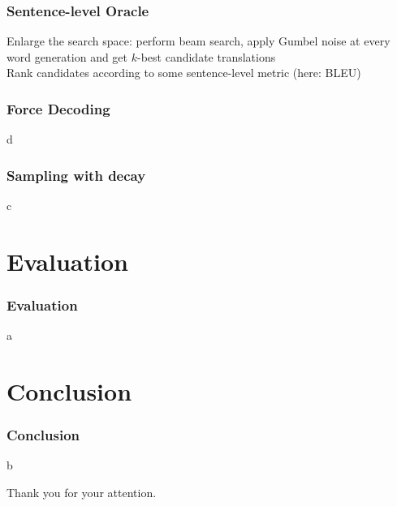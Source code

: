 \documentclass{beamer}
\begin{document}

\begin{frame}
   \frametitle{Sentence-level Oracle}
   Enlarge the search space: perform beam search, apply Gumbel noise at every word generation and get $k$-best candidate translations\\
   \bigskip
   Rank candidates according to some sentence-level metric (here: BLEU)
\end{frame}


\begin{frame}
   \frametitle{Force Decoding}
   d
\end{frame}


\begin{frame}
   \frametitle{Sampling with decay}
   c
\end{frame}


\section{Evaluation}

\begin{frame}
    \frametitle{Evaluation}
    a
\end{frame}


\section{Conclusion}

\begin{frame}
    \frametitle{Conclusion}
    b
\end{frame}


\begin{frame}
\Large{\centerline{Thank you for your attention.}}
\end{frame}

\end{document}
